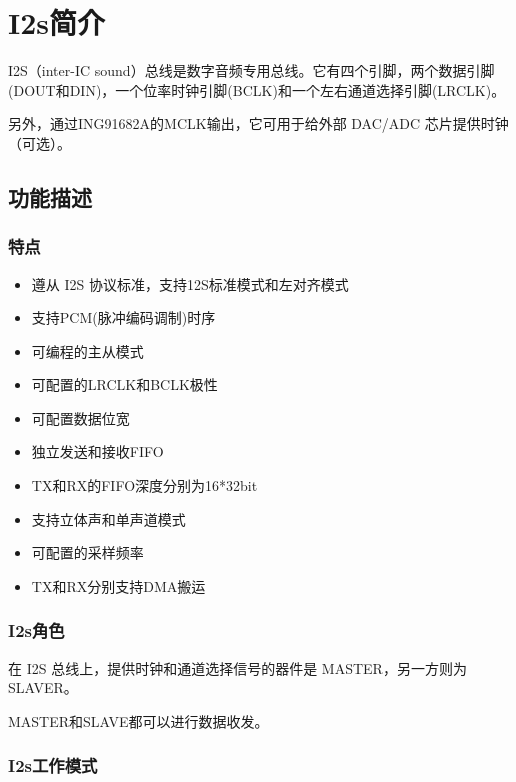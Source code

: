 \documentclass[
  12pt,
]{book}
\begin{document}
\hypertarget{i2sux7b80ux4ecb}{%
\chapter{I2s简介}\label{i2sux7b80ux4ecb}}

I2S（inter-IC sound）总线是数字音频专用总线。它有四个引脚，两个数据引脚(DOUT和DIN)，一个位率时钟引脚(BCLK)和一个左右通道选择引脚(LRCLK)。

另外，通过ING91682A的MCLK输出，它可用于给外部 DAC/ADC 芯片提供时钟（可选）。

\hypertarget{ux529fux80fdux63cfux8ff0-1}{%
\section{功能描述}\label{ux529fux80fdux63cfux8ff0-1}}

\hypertarget{ux7279ux70b9-1}{%
\subsection{特点}\label{ux7279ux70b9-1}}

\begin{itemize}
\item
  遵从 I2S 协议标准，支持12S标准模式和左对齐模式
\item
  支持PCM(脉冲编码调制)时序
\item
  可编程的主从模式
\item
  可配置的LRCLK和BCLK极性
\item
  可配置数据位宽
\item
  独立发送和接收FIFO
\item
  TX和RX的FIFO深度分别为16*32bit
\item
  支持立体声和单声道模式
\item
  可配置的采样频率
\item
  TX和RX分别支持DMA搬运
\end{itemize}

\hypertarget{i2sux89d2ux8272}{%
\subsection{I2s角色}\label{i2sux89d2ux8272}}

在 I2S 总线上，提供时钟和通道选择信号的器件是 MASTER，另一方则为 SLAVER。

MASTER和SLAVE都可以进行数据收发。

\hypertarget{i2sux5de5ux4f5cux6a21ux5f0f}{%
\subsection{I2s工作模式}\label{i2sux5de5ux4f5cux6a21ux5f0f}}
\end{document}
